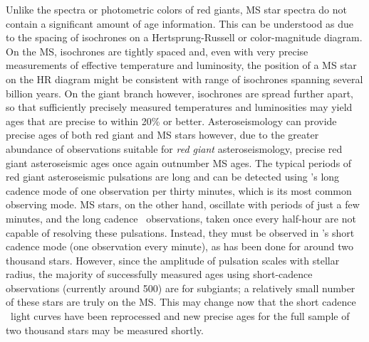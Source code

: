 Unlike the spectra or photometric colors of red giants, MS star spectra do not
contain a significant amount of age information.
This can be understood as due to the spacing of isochrones on a
Hertsprung-Russell or color-magnitude diagram.
On the MS, isochrones are tightly spaced and, even with very precise
measurements of effective temperature and luminosity, the position of a MS
star on the HR diagram might be consistent with range of isochrones spanning
several billion years.
On the giant branch however, isochrones are spread further apart, so that
sufficiently precisely measured temperatures and luminosities may yield ages
that are precise to within 20\% or better.
Asteroseismology can provide precise ages of both red giant and MS stars
however, due to the greater abundance of observations suitable for {\it red
giant} asteroseismology, precise red giant asteroseismic ages once again
outnumber MS ages.
The typical periods of red giant asteroseismic pulsations are long and can be
detected using \kepler's long cadence mode of one observation per thirty
minutes, which is its most common observing mode.
MS stars, on the other hand, oscillate with periods of just a few minutes, and
the long cadence \kepler\ observations, taken once every half-hour are not
capable of resolving these pulsations.
Instead, they must be observed in \kepler's short cadence mode (one
observation every minute), as has been done for around two thousand stars.
However, since the amplitude of pulsation scales with stellar radius, the
majority of successfully measured ages using short-cadence observations
(currently around 500) are
for subgiants; a relatively small number of these stars are truly on the MS.
This may change now that the short cadence \kepler\ light curves have been
reprocessed and new precise ages for the full sample of two thousand stars may
be measured shortly.

